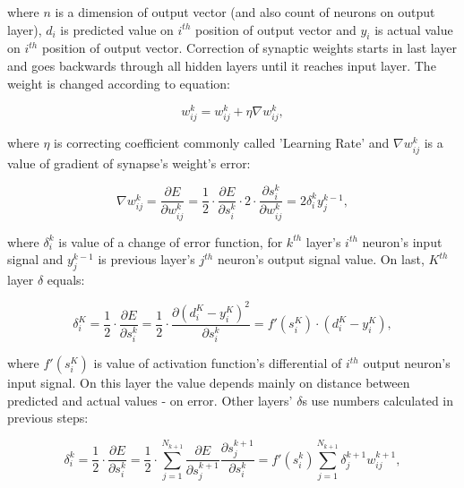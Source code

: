 \documentclass[conference]{IEEEtran}
\begin{document}
\vspace{5pt}    
\noindent where $n$ is a dimension of output vector (and also count of neurons on output layer), $d_i$ is predicted value on $i^{th}$ position of output vector and $y_i$ is actual value on $i^{th}$ position of output vector. Correction of synaptic weights starts in last layer and goes backwards through all hidden layers until it reaches input layer. The weight is changed according to equation:

    \begin{equation*}
        w^k_{ij} = w^k_{ij} + \eta \nabla w^k_{ij},
    \end{equation*}

\vspace{5pt}    
\noindent where $\eta$ is correcting coefficient commonly called 'Learning Rate' and $\nabla w^k_{ij}$ is a value of gradient of synapse's weight's error:

    \begin{equation*}
        \nabla w^k_{ij} = \frac{\partial E}{\partial w^k_{ij}} = \frac{1}{2} \cdot \frac{\partial E}{\partial s^k_i} \cdot 2 \cdot \frac{\partial s^k_i}{\partial w^k_{ij}} = 2 \delta^k_i y^{k-1}_j,
    \end{equation*}
    
\vspace{5pt}
\noindent where $\delta^k_i$ is value of a change of error function, for $k^{th}$ layer's $i^{th}$ neuron's input signal and $y^{k-1}_j$ is previous layer's $j^{th}$ neuron's output signal value. On last, $K^{th}$ layer $\delta$ equals:

    \begin{equation*}
        \delta^K_i = \frac{1}{2} \cdot \frac{\partial E}{\partial s^k_i} = \frac{1}{2} \cdot \frac{\partial (d^K_{i} - y^K_{i})^2}{\partial s^k_i} = f'(s^K_i) \cdot (d^K_{i} - y^K_{i}),
    \end{equation*}
 
 \vspace{5pt}   
\noindent where $f'(s^K_i)$ is value of activation function's differential of $i^{th}$ output neuron's input signal. On this layer the value depends mainly on distance between predicted and actual values - on error. Other layers' $\delta$s use numbers calculated in previous steps:

    \begin{equation*}
        \delta^k_i = \frac{1}{2} \cdot \frac{\partial E}{\partial s^k_i} = \frac{1}{2} \cdot \sum_{j=1}^{N_{k+1}} \frac{\partial E}{\partial s_j^{k+1}} \frac{\partial s_j^{k+1}}{\partial s^k_i} = f'(s^k_i) \sum_{j=1}^{N_{k+1}} \delta^{k+1}_j w^{k+1}_{ij},
    \end{equation*}
 
\end{document}
